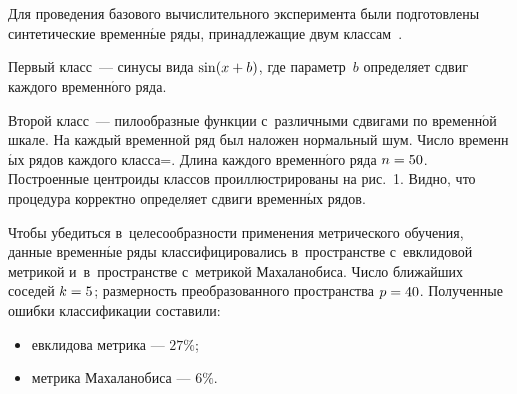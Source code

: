 \begin{multicols}{2}
\renewcommand{\figurename}{\protect\bf Рис.}
\setcounter{figure}{0}


\begin{figure*} %
\vspace*{1pt}
 \begin{center}  
\mbox{%
 \epsfxsize=79.311mm
 }
\end{center} 
\vspace*{-15pt}
\vspace*{1pt}
 \begin{center}
 \mbox{%
 \epsfxsize=163.735mm
 }
 \end{center}
 \vspace*{-15pt}
\label{centroids_real}
\vspace*{-0.15556pt}
\end{figure*}




Для проведения базового вычислительного эксперимента были подготовлены 
синтетические временн$\acute{\mbox{ы}}$е ряды, принадлежащие двум классам~\cite{Isachenko2015code}.

Первый класс~--- синусы вида $\sin(x \hm+ b)$, где параметр~$b$ определяет сдвиг 
каждого временн$\acute{\mbox{о}}$го ряда.

Второй класс~--- пилообразные функции с~различными сдвигами по временн$\acute{\mbox{о}}$й шкале.
На каж\-дый временной ряд был наложен нормальный шум.
Число временн$\acute{\mbox{ы}}$х рядов каждого клас\-са\;=.
Длина каждого временн$\acute{\mbox{о}}$го ряда $n \hm= 50$.
%
Построенные центроиды классов проиллюстрированы на рис.~1.
Видно, что процедура корректно определяет сдвиги временн$\acute{\mbox{ы}}$х 
рядов.


Чтобы убедиться в~целесообразности применения метрического обучения, данные
временн$\acute{\mbox{ы}}$е\linebreak
 ряды классифицировались в~пространстве с~евклидовой метрикой 
и~в~пространстве с~мет\-ри\-кой Махаланобиса.
Число ближайших соседей $k \hm= 5$; размерность преобразованного пространства 
$p \hm= 40$. Полученные ошибки классификации составили:
\begin{itemize}
\item евклидова метрика --- $27\%$;
\item
метрика Махаланобиса --- $6\%$.
\end{itemize}

\end{multicols}


